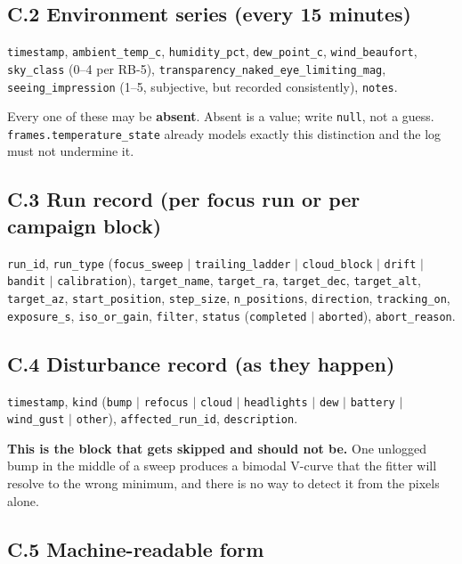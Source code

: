 \documentclass[11pt]{article}
\newcommand{\co}[1]{\texttt{\small #1}}
\begin{document}
\subsection*{C.2 Environment series (every 15 minutes)}

\co{timestamp}, \co{ambient\_temp\_c}, \co{humidity\_pct}, \co{dew\_point\_c},
\co{wind\_beaufort}, \co{sky\_class} (0--4 per RB-5),
\co{transparency\_naked\_eye\_limiting\_mag}, \co{seeing\_impression}
(1--5, subjective, but recorded consistently), \co{notes}.

\begin{keybox}
Every one of these may be \textbf{absent}. Absent is a value; write
\co{null}, not a guess. \co{frames.temperature\_state} already models exactly
this distinction and the log must not undermine it.
\end{keybox}

\subsection*{C.3 Run record (per focus run or per campaign block)}

\co{run\_id}, \co{run\_type} (\co{focus\_sweep} $\vert$ \co{trailing\_ladder}
$\vert$ \co{cloud\_block} $\vert$ \co{drift} $\vert$ \co{bandit} $\vert$
\co{calibration}), \co{target\_name}, \co{target\_ra}, \co{target\_dec},
\co{target\_alt}, \co{target\_az}, \co{start\_position}, \co{step\_size},
\co{n\_positions}, \co{direction}, \co{tracking\_on}, \co{exposure\_s},
\co{iso\_or\_gain}, \co{filter}, \co{status}
(\co{completed} $\vert$ \co{aborted}), \co{abort\_reason}.

\subsection*{C.4 Disturbance record (as they happen)}

\co{timestamp}, \co{kind} (\co{bump} $\vert$ \co{refocus} $\vert$
\co{cloud} $\vert$ \co{headlights} $\vert$ \co{dew} $\vert$ \co{battery} $\vert$
\co{wind\_gust} $\vert$ \co{other}), \co{affected\_run\_id}, \co{description}.

\textbf{This is the block that gets skipped and should not be.} One unlogged
bump in the middle of a sweep produces a bimodal V-curve that the fitter will
resolve to the wrong minimum, and there is no way to detect it from the pixels
alone.

\subsection*{C.5 Machine-readable form}
\end{document}
